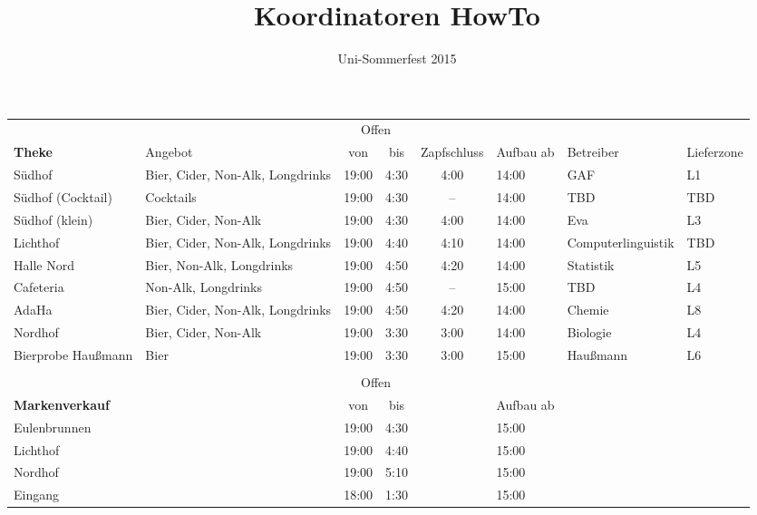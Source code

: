 \documentclass[a4paper]{article}
\title{Koordinatoren HowTo}
\author{Uni-Sommerfest 2015}
\date{}
\begin{document}
\maketitle
\begin{tabular}{p{1.7cm}p{2.7cm}ccclp{2cm}l}
  & & \multicolumn{2}{c}{Offen} \\
  \multirow{-2}{*}{\textbf{Theke}} & \multirow{-2}{*}{Angebot} & von & bis & \multirow{-2}{*}{\parbox{1cm}{Zapf\-schluss}} & \multirow{-2}{*}{\parbox{1cm}{Aufbau ab}} & \multirow{-2}{*}{Betreiber} & \multirow{-2}{*}{Lieferzone} \\ \hline \hline
  Südhof & Bier, Cider, Non-Alk, Longdrinks & 19:00 & 4:30 & 4:00 & 14:00 & GAF & L1 \\ \hline
  Südhof (Cocktail) & Cocktails & 19:00 & 4:30 & -- & 14:00 & TBD & TBD \\ \hline %
  Südhof (klein) & Bier, Cider, Non-Alk & 19:00 & 4:30 & 4:00 & 14:00 & Eva & L3 \\ \hline
  Lichthof & Bier, Cider, Non-Alk, Longdrinks & 19:00 & 4:40 & 4:10 & 14:00 & Computer\-linguistik & TBD \\ \hline %
  Halle Nord & Bier, Non-Alk, Longdrinks & 19:00 & 4:50 & 4:20 & 14:00 & Statistik & L5 \\ \hline
  Cafeteria & Non-Alk, Longdrinks & 19:00 & 4:50 & -- & 15:00 & TBD & L4 \\ \hline %
  AdaHa & Bier, Cider, Non-Alk, Longdrinks & 19:00 & 4:50 & 4:20 & 14:00 & Chemie & L8 \\ \hline
  Nordhof & Bier, Cider, Non-Alk & 19:00 & 3:30 & 3:00 & 14:00 & Biologie & L4 \\ \hline
  Bierprobe Haußmann & Bier & 19:00 & 3:30 & 3:00 & 15:00 & Haußmann & L6 \\ \\
  & & \multicolumn{2}{c}{Offen} \\
  \multirow{-2}{*}{\textbf{Markenverkauf}} & & von & bis & & \multirow{-2}{*}{\parbox{1cm}{Aufbau ab}} \\ \hline \hline
  Eulenbrunnen & & 19:00 & 4:30 & & 15:00 \\
  Lichthof & & 19:00 & 4:40 & & 15:00 \\
  Nordhof & & 19:00 & 5:10 & & 15:00 \\
  Eingang & & 18:00 & 1:30 & & 15:00
\end{tabular}

\end{document}
